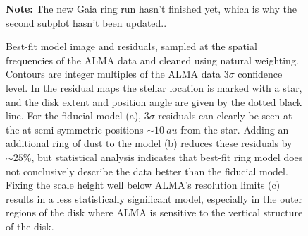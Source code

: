 \documentclass[modern]{aastex62}
\begin{document}
\begin{figure}
  \centering

  \qquad

  \qquad

  \qquad

  \caption{Best-fit model image and residuals, sampled at the spatial frequencies of the ALMA data and cleaned using natural weighting. 
  Contours are integer multiples of the ALMA data $3\sigma$ confidence level. 
  In the residual maps the stellar location is marked with a star, and the disk extent and position angle are given by the dotted black line.
  For the fiducial model (a), $3\sigma$ residuals can clearly be seen at the at semi-symmetric positions $\sim \SI{10}{au}$ from the star. 
  Adding an additional ring of dust to the model (b) reduces these residuals by $\sim 25 \%$, but statistical analysis indicates that best-fit ring model does not conclusively describe the data better than the fiducial model.
  Fixing the scale height well below ALMA's resolution limits (c) results in a less statistically significant model, especially in the outer regions of the disk where ALMA is sensitive to the vertical structure of the disk.}
  \textbf{Note:} The new Gaia ring run hasn't finished yet, which is why the second subplot hasn't been updated..
\end{figure}
\end{document}
